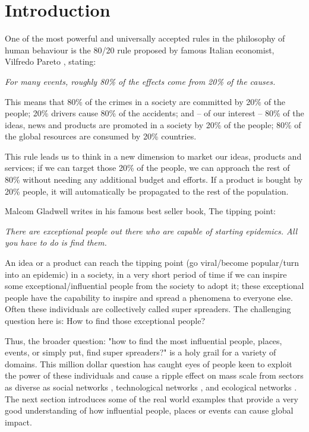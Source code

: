 \chapter{Introduction}
\label{chp:intro}

One of the most powerful and universally accepted rules in the philosophy of human behaviour is the 80/20 rule proposed by famous Italian economist, Vilfredo Pareto \cite{pareto1971}, stating:

\textit{For many events, roughly 80\% of the effects come from 20\% of the causes.}

This means that 80\% of the crimes in a society are committed by 20\% of the people; 20\% drivers cause 80\% of the accidents; and – of our interest – 80\% of the ideas, news and products are promoted in a society by 20\% of the people; 80\% of the global resources are consumed by 20\% countries.

This rule leads us to think in a new dimension to market our ideas, products and services; if we can target those 20\% of the people, we can approach the rest of 80\% without needing any additional budget and efforts. If a product is bought by 20\% people, it will automatically be propagated to the rest of the population.

Malcom Gladwell \cite{gladwell2006} writes in his famous best seller book, The tipping point:

\textit{There are exceptional people out there who are capable of starting epidemics. All you have to do is find them.}

An idea or a product can reach the tipping point (go viral/become popular/turn into an epidemic) in a society, in a very short period of time if we can inspire some exceptional/influential people from the society to adopt it; these exceptional people have the capability to inspire and spread a phenomena to everyone else. Often these individuals are collectively called super spreaders. The challenging question here is: How to find those exceptional people?

Thus, the broader question: "how to find  the most influential people, places, events, or simply put, find super spreaders?" is a holy grail for a variety of domains. This million dollar question has caught eyes of people keen to exploit the power of these individuals and cause a ripple effect on mass scale from sectors as diverse as social networks \cite{chen2009, bonchi2011}, technological networks \cite{wang2010,teuscher2006}, and ecological networks \cite{williams2002,guimaraes2007}. The next section introduces some of the real world examples that provide a very good understanding of how influential people, places or events can cause global impact.

